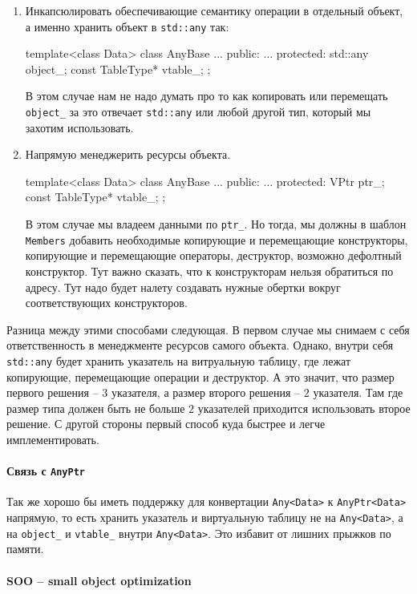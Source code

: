 \begin{enumerate}
\item Инкапсюлировать обеспечивающие семантику операции в отдельный объект, а именно хранить объект в \verb"std::any" так:
\begin{cppcode}
template<class Data>
class AnyBase {
  ...
public:
  ...
protected:
  std::any object_;
  const TableType* vtable_;
};
\end{cppcode}
В этом случае нам не надо думать про то как копировать или перемещать \verb"object_" за это отвечает \verb"std::any" или любой другой тип, который мы захотим использовать.

\item Напрямую менеджерить ресурсы объекта.
\begin{cppcode}
template<class Data>
class AnyBase {
  ...
public:
  ...
protected:
  VPtr ptr_;
  const TableType* vtable_;
};
\end{cppcode}
В этом случае мы владеем данными по \verb"ptr_".
Но тогда, мы должны в шаблон \verb"Members" добавить необходимые копирующие и перемещающие конструкторы, копирующие и перемещающие операторы, деструктор, возможно дефолтный конструктор.
Тут важно сказать, что к конструкторам нельзя обратиться по адресу.
Тут надо будет налету создавать нужные обертки вокруг соответствующих конструкторов.
\end{enumerate}
Разница между этими способами следующая.
В первом случае мы снимаем с себя ответственность в менеджменте ресурсов самого объекта.
Однако, внутри себя \verb"std::any" будет хранить указатель на витруальную таблицу, где лежат копирующие, перемещающие операции и деструктор.
А это значит, что размер первого решения -- $3$ указателя, а размер второго решения -- $2$ указателя.
Там где размер типа должен быть не больше $2$ указателей приходится использовать второе решение.
С другой стороны первый способ куда быстрее и легче имплементировать.

\paragraph{Связь с \texttt{AnyPtr}}

Так же хорошо бы иметь поддержку для конвертации \verb"Any<Data>" к \verb"AnyPtr<Data>" напрямую, то есть хранить указатель и виртуальную таблицу не на \verb"Any<Data>", а на \verb"object_" и \verb"vtable_" внутри \verb"Any<Data>".
Это избавит от лишних прыжков по памяти.

\paragraph{SOO -- small object optimization}

